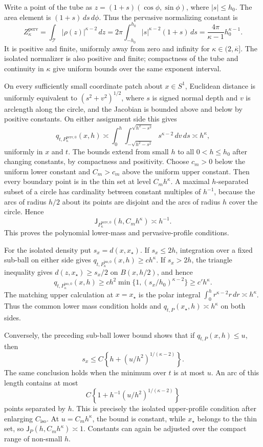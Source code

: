 Write a point of the tube as \(z=(1+s)(\cos\phi,\sin\phi)\), where \(|s|\le h_0\). The area element is \((1+s)\,ds\,d\phi\). Thus the pervasive normalizing constant is
\[
 Z_{\kappa}^{\mathrm{perv}}
 =\int_{\mathcal T}|\rho(z)|^{\kappa-2}\,dz
 =2\pi\int_{-h_0}^{h_0}|s|^{\kappa-2}(1+s)\,ds
 =\frac{4\pi}{\kappa-1}h_0^{\kappa-1}.
\]
It is positive and finite, uniformly away from zero and infinity for \(\kappa\in(2,\overline\kappa]\). The isolated normalizer is also positive and finite; compactness of the tube and continuity in \(\kappa\) give uniform bounds over the same exponent interval.

On every sufficiently small coordinate patch about \(x\in S^1\), Euclidean distance is uniformly equivalent to \((s^2+v^2)^{1/2}\), where \(s\) is signed normal depth and \(v\) is arclength along the circle, and the Jacobian is bounded above and below by positive constants. On either assignment side this gives
\[
 q_{t,P_{\kappa}^{\mathrm{perv},0}}(x,h)
 \asymp \int_0^h\int_{-\sqrt{h^2-s^2}}^{\sqrt{h^2-s^2}}s^{\kappa-2}\,dv\,ds
 \asymp h^{\kappa},
\]
uniformly in \(x\) and \(t\). The bounds extend from small \(h\) to all \(0<h\le h_0\) after changing constants, by compactness and positivity. Choose \(c_m>0\) below the uniform lower constant and \(C_m>c_m\) above the uniform upper constant. Then every boundary point is in the thin set at level \(C_mh^\kappa\). A maximal \(h\)-separated subset of a circle has cardinality between constant multiples of \(h^{-1}\), because the arcs of radius \(h/2\) about its points are disjoint and the arcs of radius \(h\) cover the circle. Hence
\[
 \mathsf J_{P_{\kappa}^{\mathrm{perv},0}}(h,C_mh^\kappa)\asymp h^{-1}.
\]
This proves the polynomial lower-mass and pervasive-profile conditions.

For the isolated density put \(s_x=d(x,x_\star)\). If \(s_x\le2h\), integration over a fixed sub-ball on either side gives \(q_{t,P_{\kappa}^{\mathrm{iso},0}}(x,h)\ge c h^\kappa\). If \(s_x>2h\), the triangle inequality gives \(d(z,x_\star)\ge s_x/2\) on \(B(x,h/2)\), and hence
\[
 q_{t,P_{\kappa}^{\mathrm{iso},0}}(x,h)
 \ge c h^2\min\{1,(s_x/h_0)^{\kappa-2}\}
 \ge c'h^\kappa.
\]
The matching upper calculation at \(x=x_\star\) is the polar integral \(\int_0^h r^{\kappa-2}r\,dr\asymp h^\kappa\). Thus the common lower mass condition holds and \(q_{t,P}(x_\star,h)\asymp h^\kappa\) on both sides.

Conversely, the preceding sub-ball lower bound shows that if \(q_{t,P}(x,h)\le u\), then
\[
 s_x\le C\left\{h+(u/h^2)^{1/(\kappa-2)}\right\}.
\]
The same conclusion holds when the minimum over \(t\) is at most \(u\). An arc of this length contains at most
\[
 C\left\{1+h^{-1}(u/h^2)^{1/(\kappa-2)}\right\}
\]
points separated by \(h\). This is precisely the isolated upper-profile condition after enlarging \(C_{\mathrm{iso}}\). At \(u=C_mh^\kappa\), the bound is constant, while \(x_\star\) belongs to the thin set, so \(\mathsf J_P(h,C_mh^\kappa)\asymp1\). Constants can again be adjusted over the compact range of non-small \(h\).

